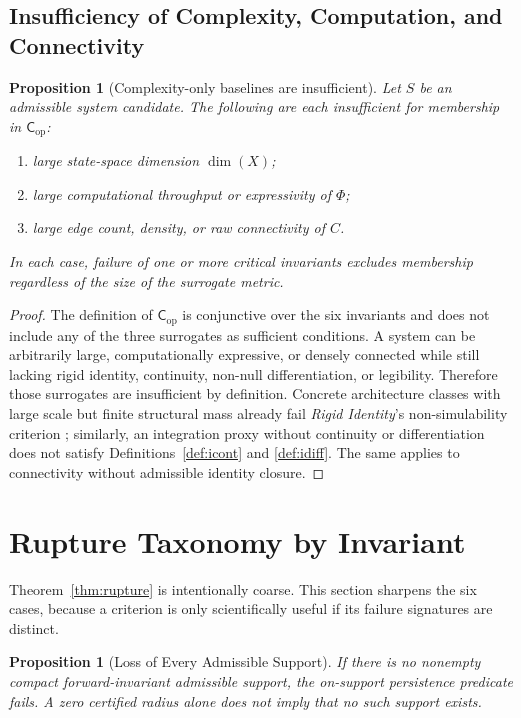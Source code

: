 \documentclass[11pt,a4paper]{article}
\newtheorem{proposition}[theorem]{Proposition}
\theoremstyle{definition}
\newcommand{\Cop}{\mathsf{C}_{\mathrm{op}}}
\begin{document}
\subsection{Insufficiency of Complexity, Computation, and Connectivity}
\begin{proposition}[Complexity-only baselines are insufficient]\label{prop:insufficient}
Let $S$ be an admissible system candidate. The following are each insufficient for membership in $\Cop$:
\begin{enumerate}[leftmargin=1.5em]
\item large state-space dimension $\dim(X)$;
\item large computational throughput or expressivity of $\Phi$;
\item large edge count, density, or raw connectivity of $C$.
\end{enumerate}
In each case, failure of one or more critical invariants excludes membership regardless of the size of the surrogate metric.
\end{proposition}

\begin{proof}
The definition of $\Cop$ is conjunctive over the six invariants and does not include any of the three surrogates as sufficient conditions. A system can be arbitrarily large, computationally expressive, or densely connected while still lacking rigid identity, continuity, non-null differentiation, or legibility. Therefore those surrogates are insufficient by definition. Concrete architecture classes with large scale but finite structural mass already fail \textit{Rigid Identity}'s non-simulability criterion \cite{paper1}; similarly, an integration proxy without continuity or differentiation does not satisfy Definitions~\ref{def:icont} and \ref{def:idiff}. The same applies to connectivity without admissible identity closure.
\end{proof}

\section{Rupture Taxonomy by Invariant}
Theorem~\ref{thm:rupture} is intentionally coarse. This section sharpens the six cases, because a criterion is only scientifically useful if its failure signatures are distinct.

\begin{proposition}[Loss of Every Admissible Support]\label{prop:rupt-per}
If there is no nonempty compact forward-invariant admissible support, the on-support persistence predicate fails. A zero certified radius alone does not imply that no such support exists.
\end{proposition}
\end{document}
